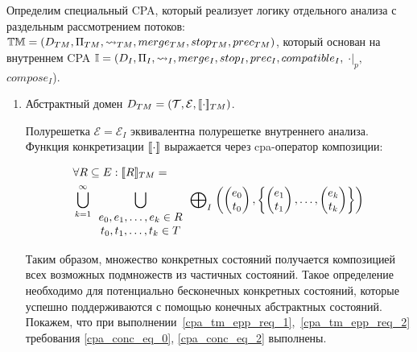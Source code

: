 Определим специальный CPA, который реализует логику отдельного анализа с раздельным рассмотрением потоков: $\mathbb{TM}=(D_{TM}, \Pi_{TM}, \leadsto_{TM}, merge_{TM}, stop_{TM}, prec_{TM})$, который основан на внутреннем CPA $\mathbb{I}=(D_{I}, \Pi_{I}, \leadsto_{I}, merge_{I}, stop_{I}, prec_{I}, compatible_{I},$ $\cdot|_p,$ $compose_I$).

\begin{enumerate}

\item Абстрактный домен $D_{TM}=(\mathcal{T}, \mathcal{E}, [\![ \cdot ]\!]_{TM})$.

Полурешетка $\mathcal{E}=\mathcal{E}_I$ эквивалентна полурешетке внутреннего анализа.
Функция конкретизации $[\![ \cdot ]\!]$ выражается через cpa-оператор композиции:

\begin{equation}
\label{cpa_conc_tm_def}
\begin{aligned}
& \forall R \subseteq E: [\![ R ]\!]_{TM} = \\ & \bigcup_{k=1}^{\infty}{ 
\bigcup_{
\begin{array}{c}
e_0, e_1,\dots,e_k \in R \\
t_0, t_1,\dots,t_k \in T
\end{array}
} {
\mathrel{\bigoplus}_I
\left(
\begin{pmatrix}
e_0 \\
t_0 
\end{pmatrix},
\left\{
\begin{pmatrix}
e_1 \\
t_1 
\end{pmatrix},
\dots ,
\begin{pmatrix}
e_k \\
t_k 
\end{pmatrix}
\right\}
\right)
}
}
\end{aligned}
\end{equation}

Таким образом, множество конкретных состояний получается композицией всех возможных подмножеств из частичных состояний.
Такое определение необходимо для потенциально бесконечных конкретных состояний, которые успешно поддерживаются с помощью конечных абстрактных состояний.
Покажем, что при выполнении~\ref{cpa_tm_epp_req_1},~\ref{cpa_tm_epp_req_2} требования \ref{cpa_conc_eq_0}, \ref{cpa_conc_eq_2} выполнены.


\end{enumerate}
